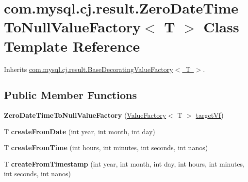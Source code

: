 \hypertarget{classcom_1_1mysql_1_1cj_1_1result_1_1_zero_date_time_to_null_value_factory}{}\section{com.\+mysql.\+cj.\+result.\+Zero\+Date\+Time\+To\+Null\+Value\+Factory$<$ T $>$ Class Template Reference}
\label{classcom_1_1mysql_1_1cj_1_1result_1_1_zero_date_time_to_null_value_factory}


Inherits \mbox{\hyperlink{classcom_1_1mysql_1_1cj_1_1result_1_1_base_decorating_value_factory}{com.\+mysql.\+cj.\+result.\+Base\+Decorating\+Value\+Factory$<$ T $>$}}.

\subsection*{Public Member Functions}
\begin{DoxyCompactItemize}
\item 
\mbox{\label{classcom_1_1mysql_1_1cj_1_1result_1_1_zero_date_time_to_null_value_factory_ae4db69d63ed6dca395ad822b7585577f}} 
{\bfseries Zero\+Date\+Time\+To\+Null\+Value\+Factory} (\mbox{\hyperlink{interfacecom_1_1mysql_1_1cj_1_1result_1_1_value_factory}{Value\+Factory}}$<$ T $>$ \mbox{\hyperlink{classcom_1_1mysql_1_1cj_1_1result_1_1_base_decorating_value_factory_a64c2c62bd9906ec3af7fc62e58bf34b3}{target\+Vf}})
\item 
\mbox{\label{classcom_1_1mysql_1_1cj_1_1result_1_1_zero_date_time_to_null_value_factory_a9c5174a7c37d8a880505d0bfcaccb891}} 
T {\bfseries create\+From\+Date} (int year, int month, int day)
\item 
\mbox{\label{classcom_1_1mysql_1_1cj_1_1result_1_1_zero_date_time_to_null_value_factory_a22e98e55a6975488e6f74fb406141a31}} 
T {\bfseries create\+From\+Time} (int hours, int minutes, int seconds, int nanos)
\item 
\mbox{\label{classcom_1_1mysql_1_1cj_1_1result_1_1_zero_date_time_to_null_value_factory_acda714c019ea312d52c002f606ca097b}} 
T {\bfseries create\+From\+Timestamp} (int year, int month, int day, int hours, int minutes, int seconds, int nanos)
\end{DoxyCompactItemize}
